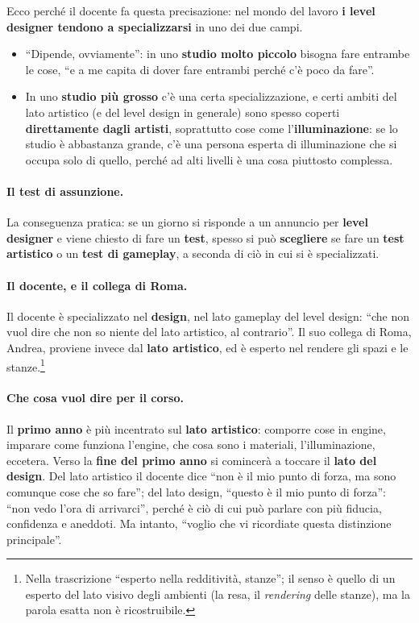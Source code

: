Ecco perché il docente fa questa precisazione: nel mondo del lavoro \textbf{i
level designer tendono a specializzarsi} in uno dei due campi.
\begin{itemize}
  \item ``Dipende, ovviamente'': in uno \textbf{studio molto piccolo} bisogna
        fare entrambe le cose, ``e a me capita di dover fare entrambi perché
        c'è poco da fare''.
  \item In uno \textbf{studio più grosso} c'è una certa specializzazione, e
        certi ambiti del lato artistico (e del level design in generale) sono
        spesso coperti \textbf{direttamente dagli artisti}, soprattutto cose
        come l'\textbf{illuminazione}: se lo studio è abbastanza grande, c'è una
        persona esperta di illuminazione che si occupa solo di quello, perché
        ad alti livelli è una cosa piuttosto complessa.
\end{itemize}

\paragraph{Il test di assunzione.} La conseguenza pratica: se un giorno si
risponde a un annuncio per \textbf{level designer} e viene chiesto di fare un
\textbf{test}, spesso si può \textbf{scegliere} se fare un \textbf{test
artistico} o un \textbf{test di gameplay}, a seconda di ciò in cui si è
specializzati.

\paragraph{Il docente, e il collega di Roma.} Il docente è specializzato nel
\textbf{design}, nel lato gameplay del level design: ``che non vuol dire che non
so niente del lato artistico, al contrario''. Il suo collega di Roma, Andrea,
proviene invece dal \textbf{lato artistico}, ed è esperto nel rendere gli spazi
e le stanze.\footnote{Nella trascrizione ``esperto nella redditività,
stanze''; il senso è quello di un esperto del lato visivo degli ambienti (la
resa, il \emph{rendering} delle stanze), ma la parola esatta non è
ricostruibile.}

\paragraph{Che cosa vuol dire per il corso.} Il \textbf{primo anno} è più
incentrato sul \textbf{lato artistico}: comporre cose in engine, imparare come
funziona l'engine, che cosa sono i materiali, l'illuminazione, eccetera. Verso
la \textbf{fine del primo anno} si comincerà a toccare il \textbf{lato del
design}. Del lato artistico il docente dice ``non è il mio punto di forza, ma
sono comunque cose che so fare''; del lato design, ``questo è il mio punto di
forza'': ``non vedo l'ora di arrivarci'', perché è ciò di cui può parlare con
più fiducia, confidenza e aneddoti. Ma intanto, ``voglio che vi ricordiate
questa distinzione principale''.

